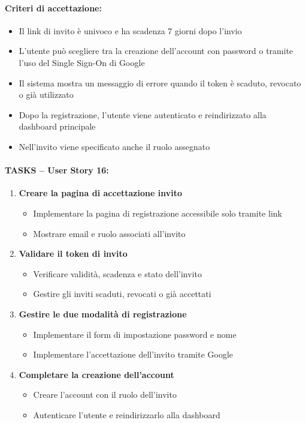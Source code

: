 \paragraph*{Criteri di accettazione:}
\begin{itemize}
    \item Il link di invito è univoco e ha scadenza 7 giorni dopo l'invio
    \item L'utente può scegliere tra la creazione dell'account con password o tramite l'uso del Single Sign-On di Google
    \item Il sistema mostra un messaggio di errore quando il token è scaduto, revocato o già utilizzato
    \item Dopo la registrazione, l'utente viene autenticato e reindirizzato alla dashboard principale
    \item Nell'invito viene specificato anche il ruolo assegnato
\end{itemize}

\paragraph*{TASKS – User Story 16:}
\begin{enumerate}
    \item \textbf{Creare la pagina di accettazione invito}
    \begin{itemize}
        \item Implementare la pagina di registrazione accessibile solo tramite link
        \item Mostrare email e ruolo associati all'invito
    \end{itemize}
    \item \textbf{Validare il token di invito}
    \begin{itemize}
        \item Verificare validità, scadenza e stato dell'invito
        \item Gestire gli inviti scaduti, revocati o già accettati
    \end{itemize}
    \item \textbf{Gestire le due modalità di registrazione}
    \begin{itemize}
        \item Implementare il form di impostazione password e nome
        \item Implementare l'accettazione dell'invito tramite Google
    \end{itemize}
    \item \textbf{Completare la creazione dell'account}
    \begin{itemize}
        \item Creare l'account con il ruolo dell'invito
        \item Autenticare l'utente e reindirizzarlo alla dashboard
    \end{itemize}
\end{enumerate}


